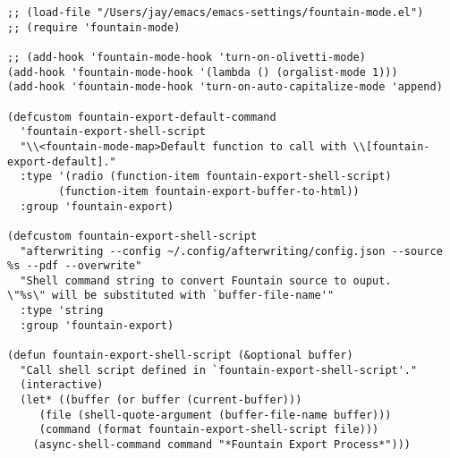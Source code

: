 \documentclass[11pt]{article}
\begin{document}
\label{sec:org0c8169a}
\begin{verbatim}
;; (load-file "/Users/jay/emacs/emacs-settings/fountain-mode.el")
;; (require 'fountain-mode)

;; (add-hook 'fountain-mode-hook 'turn-on-olivetti-mode)
(add-hook 'fountain-mode-hook '(lambda () (orgalist-mode 1)))
(add-hook 'fountain-mode-hook 'turn-on-auto-capitalize-mode 'append)

(defcustom fountain-export-default-command
  'fountain-export-shell-script
  "\\<fountain-mode-map>Default function to call with \\[fountain-export-default]."
  :type '(radio (function-item fountain-export-shell-script)
		(function-item fountain-export-buffer-to-html))
  :group 'fountain-export)

(defcustom fountain-export-shell-script
  "afterwriting --config ~/.config/afterwriting/config.json --source %s --pdf --overwrite"
  "Shell command string to convert Fountain source to ouput.
\"%s\" will be substituted with `buffer-file-name'"
  :type 'string
  :group 'fountain-export)

(defun fountain-export-shell-script (&optional buffer)
  "Call shell script defined in `fountain-export-shell-script'."
  (interactive)
  (let* ((buffer (or buffer (current-buffer)))
	 (file (shell-quote-argument (buffer-file-name buffer)))
	 (command (format fountain-export-shell-script file)))
    (async-shell-command command "*Fountain Export Process*")))


\end{verbatim}
\end{document}
